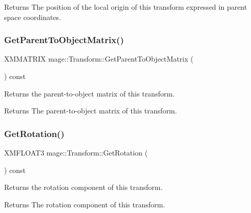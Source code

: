 \begin{DoxyReturn}{Returns}
The position of the local origin of this transform expressed in parent space coordinates. 
\end{DoxyReturn}
\hypertarget{structmage_1_1_transform_a66eee9c51ff050924d35c3747083593f}{}\label{structmage_1_1_transform_a66eee9c51ff050924d35c3747083593f} 
\subsubsection{\texorpdfstring{Get\+Parent\+To\+Object\+Matrix()}{GetParentToObjectMatrix()}}
{\footnotesize\ttfamily X\+M\+M\+A\+T\+R\+IX mage\+::\+Transform\+::\+Get\+Parent\+To\+Object\+Matrix (\begin{DoxyParamCaption}{ }\end{DoxyParamCaption}) const}

Returns the parent-\/to-\/object matrix of this transform.

\begin{DoxyReturn}{Returns}
The parent-\/to-\/object matrix of this transform. 
\end{DoxyReturn}
\hypertarget{structmage_1_1_transform_a30a0464b1bd2fb37d6b5cc2155323a14}{}\label{structmage_1_1_transform_a30a0464b1bd2fb37d6b5cc2155323a14} 
\subsubsection{\texorpdfstring{Get\+Rotation()}{GetRotation()}}
{\footnotesize\ttfamily X\+M\+F\+L\+O\+A\+T3 mage\+::\+Transform\+::\+Get\+Rotation (\begin{DoxyParamCaption}{ }\end{DoxyParamCaption}) const}

Returns the rotation component of this transform.

\begin{DoxyReturn}{Returns}
The rotation component of this transform. 
\end{DoxyReturn}
\hypertarget{structmage_1_1_transform_a27ca7a5c40ea16c9a885a410b2a1f416}{}\label{structmage_1_1_transform_a27ca7a5c40ea16c9a885a410b2a1f416} 
